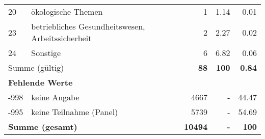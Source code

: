 \begin{longtable}{lXrrr}
        20 & \multicolumn{1}{X}{ökologische Themen} & %
          \num{1} &
          \num[round-mode=places,round-precision=2]{1.14} &
          \num[round-mode=places,round-precision=2]{0.01} \\

        23 & \multicolumn{1}{X}{betriebliches Gesundheitswesen, Arbeitssicherheit} & %
          \num{2} &
          \num[round-mode=places,round-precision=2]{2.27} &
          \num[round-mode=places,round-precision=2]{0.02} \\

        24 & \multicolumn{1}{X}{Sonstige} & %
          \num{6} &
          \num[round-mode=places,round-precision=2]{6.82} &
          \num[round-mode=places,round-precision=2]{0.06} \\

     \midrule
     \multicolumn{2}{l}{Summe (gültig)} &
       \textbf{\num{88}} &
     \textbf{\num{100}} &
       \textbf{\num[round-mode=places,round-precision=2]{0.84}} \\
     \multicolumn{5}{l}{\textbf{Fehlende Werte}}\\
       -998 &
       keine Angabe &
         \num{4667} &
        - &
         \num[round-mode=places,round-precision=2]{44.47} \\
       -995 &
       keine Teilnahme (Panel) &
         \num{5739} &
        - &
         \num[round-mode=places,round-precision=2]{54.69} \\
     \midrule
     \multicolumn{2}{l}{\textbf{Summe (gesamt)}} &
          \textbf{\num{10494}} &
        \textbf{-} &
        \textbf{\num{100}} \\
     \bottomrule
     \end{longtable}
     
